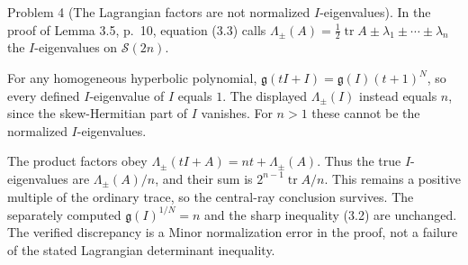 \documentclass[10pt]{article}
\begin{document}
Problem 4 (The Lagrangian factors are not normalized \(I\)-eigenvalues).  In the proof of Lemma 3.5, p. 10, equation (3.3) calls \(\Lambda_\pm(A)=\frac12\operatorname{tr}A\pm\lambda_1\pm\cdots\pm\lambda_n\) the \(I\)-eigenvalues on \(\mathcal S(2n)\).\par
For any homogeneous hyperbolic polynomial, \(\mathfrak g(tI+I)=\mathfrak g(I)(t+1)^N\), so every defined \(I\)-eigenvalue of \(I\) equals \(1\). The displayed \(\Lambda_\pm(I)\) instead equals \(n\), since the skew-Hermitian part of \(I\) vanishes. For \(n>1\) these cannot be the normalized \(I\)-eigenvalues.\par
The product factors obey \(\Lambda_\pm(tI+A)=nt+\Lambda_\pm(A)\). Thus the true \(I\)-eigenvalues are \(\Lambda_\pm(A)/n\), and their sum is \(2^{n-1}\operatorname{tr}A/n\). This remains a positive multiple of the ordinary trace, so the central-ray conclusion survives. The separately computed \(\mathfrak g(I)^{1/N}=n\) and the sharp inequality (3.2) are unchanged. The verified discrepancy is a Minor normalization error in the proof, not a failure of the stated Lagrangian determinant inequality.\par
\end{document}
